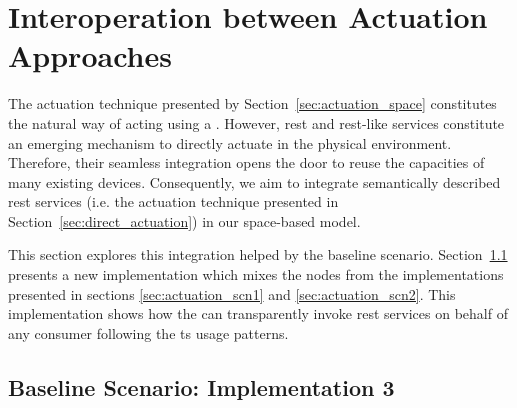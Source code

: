 \section{Interoperation between Actuation Approaches} %
\label{sec:actuation_discussion}


The actuation technique presented by Section~\ref{sec:actuation_space} constitutes the natural way of acting using a \Space{}.
However, \ac{rest} and \ac{rest}-like services constitute an emerging mechanism to directly actuate in the physical environment.
Therefore, their seamless integration opens the door to reuse the capacities of many existing devices. %
Consequently, we aim to integrate semantically described \ac{rest} services (i.e. the actuation technique presented in Section~\ref{sec:direct_actuation}) in our space-based model. %


This section explores this integration helped by the baseline scenario.
Section~\ref{sec:actuation_scn3} presents a new implementation which mixes the nodes from the implementations presented in sections \ref{sec:actuation_scn1} and \ref{sec:actuation_scn2}.
This implementation shows how the \Space{} can transparently invoke \ac{rest} services on behalf of any consumer following the \ac{ts} usage patterns. %


\subsection{Baseline Scenario: Implementation 3}
\label{sec:actuation_scn3}
\newcommand{\implMix}{\emph{Implementation 3}}

